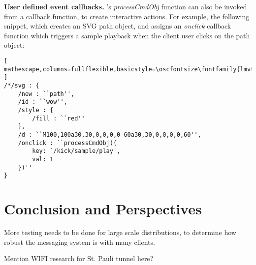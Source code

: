 \medskip
\noindent
\textbf{User defined event callbacks.}
\drawsocket's \textit{processCmdObj} function can also be invoked from a callback function, to create interactive actions. For example, the following snippet, which creates an SVG path object, and assigns an \textit{onclick} callback function which triggers a sample playback when the client user clicks on the path object:

\begin{lstlisting}[ mathescape,columns=fullflexible,basicstyle=\oscfontsize\fontfamily{lmvtt}\selectfont ]
/*/svg : {
    /new : ``path'',
    /id : ``wow'',
    /style : {
        /fill : ``red''
    },
    /d : ``M100,100a30,30,0,0,0,0-60a30,30,0,0,0,0,60'',
    /onclick : ``processCmdObj({
        key: `/kick/sample/play',
        val: 1
    })''
}
\end{lstlisting}





%
%
%
%
%
%
\section{Conclusion and Perspectives}

More testing needs to be done for large scale distributions, to determine how robust the messaging system is with many clients.

Mention WIFI research for St. Pauli tunnel here?



